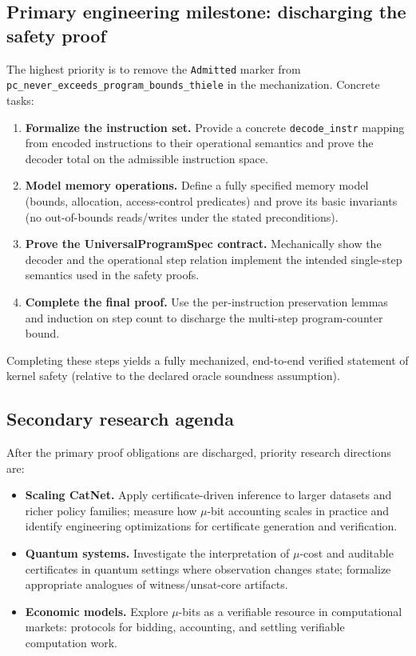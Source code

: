 \documentclass[11pt]{article}
\begin{document}
\subsection{Primary engineering milestone: discharging the safety proof}
The highest priority is to remove the \texttt{Admitted} marker from \texttt{pc\_never\_exceeds\_program\_bounds\_thiele} in the mechanization. Concrete tasks:

\begin{enumerate}
  \item \textbf{Formalize the instruction set.} Provide a concrete \texttt{decode\_instr} mapping from encoded instructions to their operational semantics and prove the decoder total on the admissible instruction space.
  \item \textbf{Model memory operations.} Define a fully specified memory model (bounds, allocation, access-control predicates) and prove its basic invariants (no out-of-bounds reads/writes under the stated preconditions).
  \item \textbf{Prove the UniversalProgramSpec contract.} Mechanically show the decoder and the operational step relation implement the intended single-step semantics used in the safety proofs.
  \item \textbf{Complete the final proof.} Use the per-instruction preservation lemmas and induction on step count to discharge the multi-step program-counter bound.
\end{enumerate}

Completing these steps yields a fully mechanized, end-to-end verified statement of kernel safety (relative to the declared oracle soundness assumption).

\subsection{Secondary research agenda}
After the primary proof obligations are discharged, priority research directions are:

\begin{itemize}
  \item \textbf{Scaling CatNet.} Apply certificate-driven inference to larger datasets and richer policy families; measure how $\mu$-bit accounting scales in practice and identify engineering optimizations for certificate generation and verification.
  \item \textbf{Quantum systems.} Investigate the interpretation of $\mu$-cost and auditable certificates in quantum settings where observation changes state; formalize appropriate analogues of witness/unsat-core artifacts.
  \item \textbf{Economic models.} Explore $\mu$-bits as a verifiable resource in computational markets: protocols for bidding, accounting, and settling verifiable computation work.
\end{itemize}
\end{document}
